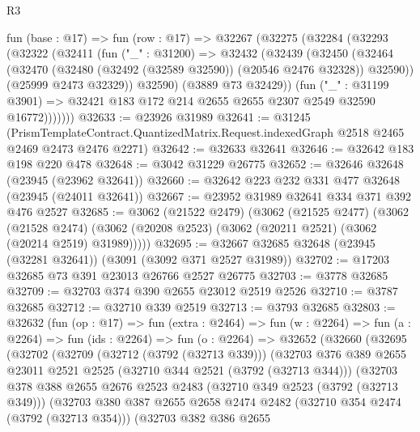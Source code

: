 \begin{lexlean}{R3}
\begin{coremodule}
    fun (base : @17) =>
    fun (row : @17) =>
    @32267
      (@32275
        (@32284
          (@32293
            (@32322
              (@32411
                (fun ("_" : @31200) =>
                @32432
                  (@32439
                    (@32450
                      (@32464
                        (@32470 (@32480 (@32492 (@32589 @32590)) (@20546 @2476 @32328)) @32590))
                      (@25999 @2473 @32329))
                    @32590)
                  (@3889 @73 @32429))
                (fun ("_" : @31199 @3901) =>
                @32421 @183 @172 @214 @2655 @2655 @2307 @2549 @32590 @16772)))))))
@32633 := @23926 @31989
@32641 := @31245
    (PrismTemplateContract.QuantizedMatrix.Request.indexedGraph @2518 @2465 @2469 @2473 @2476 @2271)
@32642 := @32633 @32641
@32646 := @32642 @183 @198 @220 @478
@32648 := @3042 @31229 @26775
@32652 := @32646 @32648 (@23945 (@23962 @32641))
@32660 := @32642 @223 @232 @331 @477 @32648 (@23945 (@24011 @32641))
@32667 := @23952 @31989 @32641 @334 @371 @392 @476 @2527
@32685 := @3062
    (@21522 @2479)
    (@3062
      (@21525 @2477)
      (@3062
        (@21528 @2474)
        (@3062 (@20208 @2523) (@3062 (@20211 @2521) (@3062 (@20214 @2519) @31989)))))
@32695 := @32667 @32685 @32648 (@23945 (@32281 @32641)) (@3091 (@3092 @371 @2527 @31989))
@32702 := @17203 @32685 @73 @391 @23013 @26766 @2527 @26775
@32703 := @3778 @32685
@32709 := @32703 @374 @390 @2655 @23012 @2519 @2526
@32710 := @3787 @32685
@32712 := @32710 @339 @2519
@32713 := @3793 @32685
@32803 := @32632
    (fun (op : @17) =>
    fun (extra : @2464) =>
    fun (w : @2264) =>
    fun (a : @2264) =>
    fun (ids : @2264) =>
    fun (o : @2264) =>
    @32652
      (@32660
        (@32695
          (@32702
            (@32709
              (@32712 (@3792 (@32713 @339)))
              (@32703
                @376
                @389
                @2655
                @23011
                @2521
                @2525
                (@32710 @344 @2521 (@3792 (@32713 @344)))
                (@32703
                  @378
                  @388
                  @2655
                  @2676
                  @2523
                  @2483
                  (@32710 @349 @2523 (@3792 (@32713 @349)))
                  (@32703
                    @380
                    @387
                    @2655
                    @2658
                    @2474
                    @2482
                    (@32710 @354 @2474 (@3792 (@32713 @354)))
                    (@32703
                      @382
                      @386
                      @2655

\end{coremodule}
\end{lexlean}
